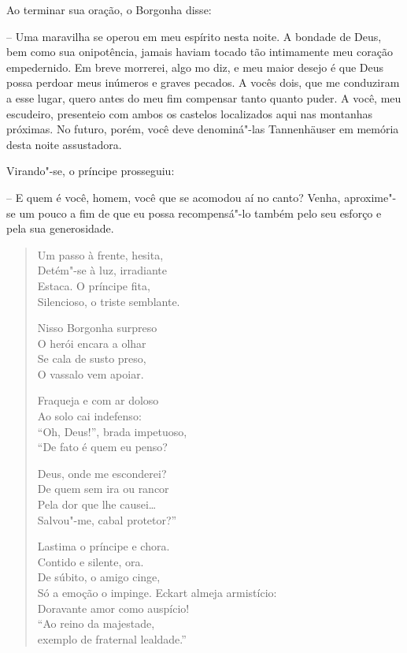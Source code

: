 Ao terminar sua oração, o Borgonha disse:

-- Uma maravilha se operou em meu espírito nesta noite. A bondade de
Deus, bem como sua onipotência, jamais haviam tocado tão intimamente
meu coração empedernido. Em breve morrerei, algo mo diz, e meu maior
desejo é que Deus possa perdoar meus inúmeros e graves pecados. A vocês
dois, que me conduziram a esse lugar, quero antes do meu fim compensar
tanto quanto puder. A você, meu escudeiro, presenteio com ambos os
castelos localizados aqui nas montanhas próximas. No futuro, porém,
você deve denominá"-las Tannenhäuser em memória desta noite assustadora.

Virando"-se, o príncipe prosseguiu:

-- E quem é você, homem, você que se acomodou aí no canto? Venha,
aproxime"-se um pouco a fim de que eu possa recompensá"-lo também pelo
seu esforço e pela sua generosidade.

\begin{verse}
Um passo à frente, hesita,\\
Detém"-se à luz, irradiante\\
Estaca. O príncipe fita,\\
Silencioso, o triste semblante.

Nisso Borgonha surpreso\\
O herói encara a olhar\\
Se cala de susto preso,\\
O vassalo vem apoiar.

Fraqueja e com ar doloso\\
Ao solo cai indefenso:\\
``Oh, Deus!'', brada impetuoso,\\
``De fato é quem eu penso?

Deus, onde me esconderei?\\
De quem sem ira ou rancor\\
Pela dor que lhe causei\ldots{} \\
Salvou"-me, cabal protetor?''

Lastima o príncipe e chora.\\
Contido e silente, ora.\\
De súbito, o amigo cinge,\\
Só a emoção o impinge.
\pagebreak
Eckart almeja armistício:\\
Doravante amor como auspício!\\
``Ao reino da majestade,\\
exemplo de fraternal lealdade.''
\end{verse}

